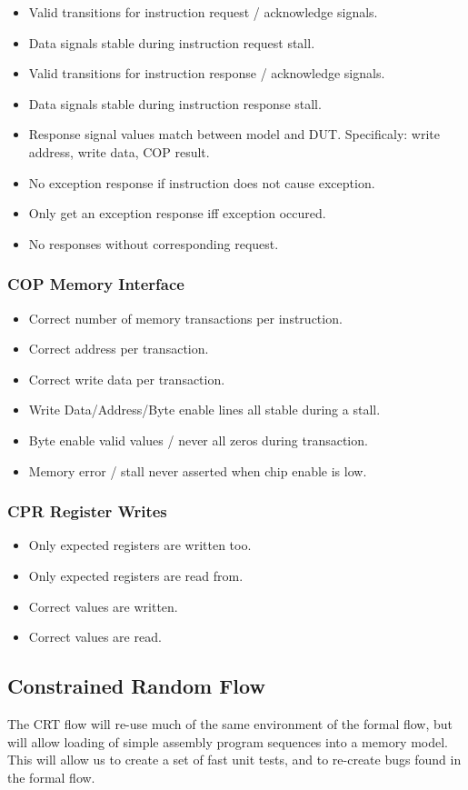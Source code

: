 \begin{itemize}
\item Valid transitions for instruction request / acknowledge signals.
\item Data signals stable during instruction request stall.
\item Valid transitions for instruction response  / acknowledge signals.
\item Data signals stable during instruction response stall.
\item Response signal values match between model and DUT. Specificaly:
    write address, write data, COP result.
\item No exception response if instruction does not cause exception.
\item Only get an exception response iff exception occured.
\item No responses without corresponding request.
\end{itemize}

\subsubsection{COP Memory Interface}

\begin{itemize}
\item Correct number of memory transactions per instruction.
\item Correct address per transaction.
\item Correct write data per transaction.
\item Write Data/Address/Byte enable lines all stable during a stall.
\item Byte enable valid values / never all zeros during transaction.
\item Memory error / stall never asserted when chip enable is low.
\end{itemize}

\subsubsection{CPR Register Writes}

\begin{itemize}
\item Only expected registers are written too.
\item Only expected registers are read from.
\item Correct values are written.
\item Correct values are read.
\end{itemize}

\subsection{Constrained Random Flow}

The CRT flow will re-use much of the same environment of the formal flow,
but will allow loading of simple assembly program sequences into a
memory model. This will allow us to create a set of fast unit tests, and to
re-create bugs found in the formal flow.

